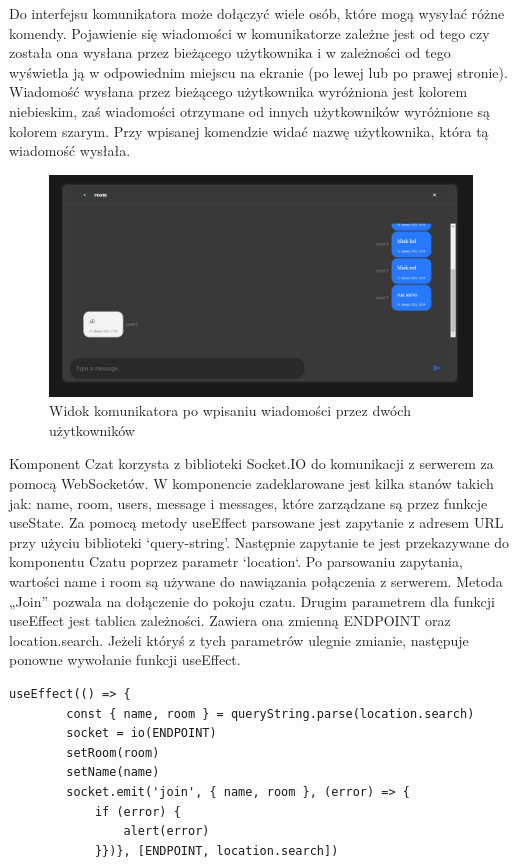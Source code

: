 Do interfejsu komunikatora może dołączyć wiele osób, które mogą wysyłać różne komendy. Pojawienie się wiadomości w komunikatorze zależne jest od tego czy została ona wysłana przez bieżącego użytkownika i w zależności od tego wyświetla ją w odpowiednim miejscu na ekranie (po lewej lub po prawej stronie). Wiadomość wysłana przez bieżącego użytkownika wyróżniona jest kolorem niebieskim, zaś wiadomości otrzymane od innych użytkowników wyróżnione są kolorem szarym. Przy wpisanej komendzie widać nazwę użytkownika, która tą wiadomość wysłała.
\begin{figure}
	\centering
	\includegraphics[width=0.5\linewidth]{"obrazy/interface2..2"}
	\caption{Widok komunikatora po wpisaniu wiadomości przez dwóch użytkowników}
	\label{fig:13}
\end{figure}
Komponent Czat korzysta z biblioteki Socket.IO do komunikacji z serwerem za pomocą WebSocketów. W komponencie zadeklarowane jest kilka stanów takich jak: name, room, users, message i messages, które zarządzane są przez funkcje useState. Za pomocą metody useEffect parsowane jest zapytanie z adresem URL przy użyciu biblioteki ‘query-string’. Następnie zapytanie te jest przekazywane do komponentu Czatu poprzez parametr `location`. Po parsowaniu zapytania, wartości name i room są używane do nawiązania połączenia z serwerem. Metoda „Join” pozwala na dołączenie do pokoju czatu. Drugim parametrem dla funkcji useEffect jest tablica zależności. Zawiera ona zmienną ENDPOINT oraz location.search. Jeżeli któryś z tych parametrów ulegnie zmianie, następuje ponowne wywołanie funkcji useEffect. 
\begin{lstlisting}[caption=Implementacja funkcji dolaczenia do komunikatora po stronie klienta]
useEffect(() => {
        const { name, room } = queryString.parse(location.search)
        socket = io(ENDPOINT)
        setRoom(room)
        setName(name)
        socket.emit('join', { name, room }, (error) => {
            if (error) {
                alert(error)
            }})}, [ENDPOINT, location.search])
\end{lstlisting}

